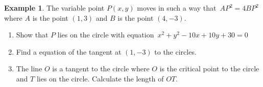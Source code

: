 \documentclass[11pt,a4paper]{article}
\theoremstyle{definition}
\newtheorem{example}[thm]{Example}
\begin{document}
\begin{example}

The variable point $P(x,y)$ moves in such a way that $\, AP^2 = 4BP^2\,$ where $A$ is the point $(1,3)$ and $B$ is the point $(4,-3)$.
\begin{enumerate}
\item[a.] Show that $P$ lies on the circle with equation $\, x^2 + y^2 - 10x + 10y + 30 = 0$

\item[b.] Find a equation of the tangent at $(1,-3)$ to the circles.

\item[c.] The line $O$ is a tangent to the circle where $O$ is the critical point to the circle and $T$ lies on the circle. Calculate the length of $OT$.\\
\end{enumerate}
\end{example}
\end{document}
